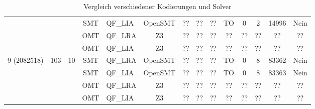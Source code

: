 \begin{landscape}
\begin{table}[H]
\begin{tabular}{|c|c|c|c|l|c|c|c|c|c|c|c|c|c|}
            & & & SMT & QF\_LIA & OpenSMT & ?? & ?? & ?? & TO & 0 & 2 & 14996 & Nein \\
            & & & OMT & QF\_LRA & Z3 & ?? & ?? & ?? & ?? & ?? & ?? & ?? & ?? \\
            & & & OMT & QF\_LIA & Z3 & ?? & ?? & ?? & ?? & ?? & ?? & ?? & ?? \\
            \hline %
            \multirow{4}{*}{9 (2082518)} & \multirow{4}{*}{103} & \multirow{4}{*}{10} & SMT & QF\_LRA & OpenSMT & ?? & ?? & ?? & TO & 0 & 8 & 83362 & Nein \\
            & & & SMT & QF\_LIA & OpenSMT & ?? & ?? & ?? & TO & 0 & 8 & 83363 & Nein \\
            & & & OMT & QF\_LRA & Z3 & ?? & ?? & ?? & ?? & ?? & ?? & ?? & ?? \\
            & & & OMT & QF\_LIA & Z3 & ?? & ?? & ?? & ?? & ?? & ?? & ?? & ?? \\
            \hline
        \end{tabular}
        \caption{Vergleich verschiedener Kodierungen und Solver}
        \label{tab:vglkodierungreal}
    \end{table}
\end{landscape}

